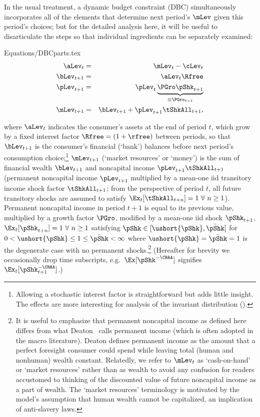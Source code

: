 \documentclass[titlepage]{\econtex}\providecommand{\texname}{BufferStockTheory}%
\providecommand{\EqDir}{Equations}
\begin{document}
In the usual treatment, a dynamic budget constraint (DBC) simultaneously incorporates
all of the elements that determine next period's $\mLev$ given this
period's choices; but for the detailed analysis here, it will be useful to
disarticulate the steps so that individual ingredients can be separately examined:
\begin{verbatimwrite}{\EqDir/DBCparts.tex}
\begin{eqnarray}
\aLev_{t}   &=&\mLev_{t}-\cLev_{t}  \label{eq:DBCparts} \\
\bLev_{t+1}   & = & \aLev_{t} \Rfree \notag \\
\pLev_{t+1} &=&\pLev_{t} \underbrace{\PGro\pShk_{t+1}}_{\equiv \PGro_{t+1}}  \notag \\
%
\mLev_{t+1} &=& \bLev_{t+1} +\pLev_{t+1}\tShkAll_{t+1},  \notag
\end{eqnarray}
\end{verbatimwrite}

where $\aLev_{t}$ indicates the consumer's assets at the end of period
$t$, which grow by a fixed interest factor $\Rfree =(1+\rfree)$
between periods, so that $\bLev_{t+1}$ is the consumer's financial
(`bank') balances before next period's consumption choice;\footnote{Allowing a
  stochastic interest factor is straightforward but adds little
  insight.  The effects are more interesting for analysis of the
  invariant distribution (\cite{szeidlInvariant}).} $\mLev_{t+1}$ (`market resources' or `money') is
the sum of financial wealth $\bLev_{t+1}$ and noncapital income $\pLev_{t+1}\tShkAll_{t+1}$ (permanent noncapital income $\pLev_{t+1}$
multiplied by a mean-one iid transitory income shock factor
$\tShkAll_{t+1}$; from the perspective of period $t$, all future
transitory shocks are assumed to satisfy
$\Ex_{t}[{\tShkAll}_{t+n}]=1~\forall~n\geq 1$). Permanent
noncapital income in period $t+1$ is equal to its previous value,
multiplied by a growth factor $\PGro$, modified by a mean-one iid
shock $\pShk_{t+1}$, $\Ex_{t}[{\pShk}_{t+n}]=1~\forall~n \geq 1$
satisfying $\pShk \in [\ushort{\pShk},\bar{\pShk}]$ for $0 <
\ushort{\pShk} \leq 1 \leq \bar{\pShk} < \infty$ where
$\ushort{\pShk}=\bar{\pShk}=1$ is the degenerate case with no
permanent shocks.\footnote{It is useful to emphasize that permanent
  noncapital income as defined here differs from what
  Deaton~\citeyearpar{deatonUnderstandingC} calls permanent income (which is
  often adopted in the macro literature).  Deaton defines permanent
  income as the amount that a perfect foresight consumer could spend
  while leaving total (human and nonhuman) wealth constant.
  Relatedly, we refer to $\mLev_{t}$ as `cash-on-hand' or `market
  resources' rather than as wealth to avoid any confusion for readers
  accustomed to thinking of the discounted value of future noncapital
  income as a part of wealth.  The `market resources' terminology is
  motivated by the model's assumption that human wealth cannot be
  capitalized, an implication of anti-slavery laws.}  (Hereafter for
brevity we occasionally drop time subscripts, e.g.\
$\Ex[\pShk^{-\CRRA}]$ signifies $\Ex_{t}[\pShk_{t+1}^{-\CRRA}]$.)
\end{document}
